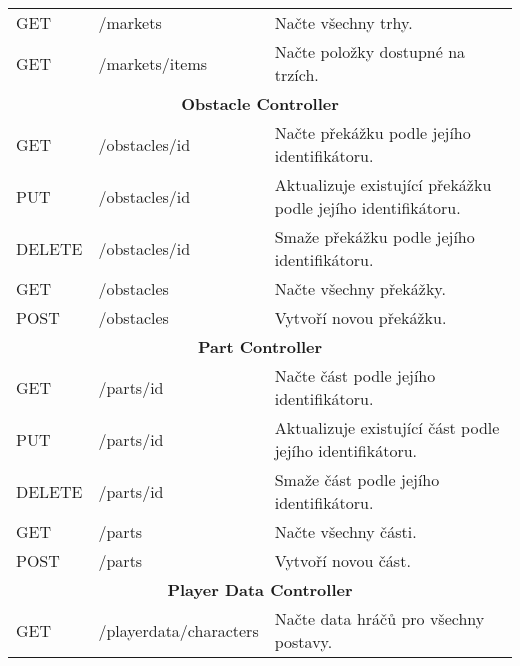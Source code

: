 \begin{longtable}{|l|l|p{}|}
    \hline
    GET             & /markets                    & Načte všechny trhy.                                                 \\
    GET             & /markets/items              & Načte položky dostupné na trzích.                                   \\
    \hline
    \multicolumn{3}{|c|}{\textbf{Obstacle Controller}}                                                                  \\
    \hline
    GET             & /obstacles/{id}             & Načte překážku podle jejího identifikátoru.                         \\
    PUT             & /obstacles/{id}             & Aktualizuje existující překážku podle jejího identifikátoru.        \\
    DELETE          & /obstacles/{id}             & Smaže překážku podle jejího identifikátoru.                         \\
    GET             & /obstacles                  & Načte všechny překážky.                                             \\
    POST            & /obstacles                  & Vytvoří novou překážku.                                             \\
    \hline
    \multicolumn{3}{|c|}{\textbf{Part Controller}}                                                                      \\
    \hline
    GET             & /parts/{id}                 & Načte část podle jejího identifikátoru.                             \\
    PUT             & /parts/{id}                 & Aktualizuje existující část podle jejího identifikátoru.            \\
    DELETE          & /parts/{id}                 & Smaže část podle jejího identifikátoru.                             \\
    GET             & /parts                      & Načte všechny části.                                                \\
    POST            & /parts                      & Vytvoří novou část.                                                 \\
    \hline
    \multicolumn{3}{|c|}{\textbf{Player Data Controller}}                                                               \\
    \hline
    GET             & /playerdata/characters      & Načte data hráčů pro všechny postavy.                               \\

\end{longtable}
